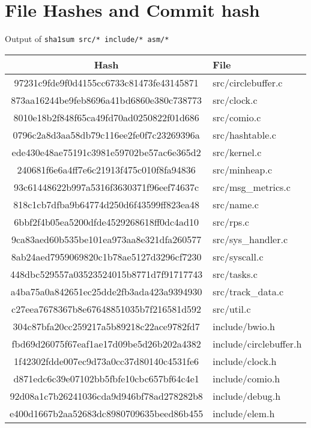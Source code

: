 \documentclass{article}
\begin{document}
\section{File Hashes and Commit hash}
\begin{minipage}{\textwidth}
Output of \verb|sha1sum src/* include/* asm/*|

\begin{tabular}{|c|l|}
\hline
Hash & File\\
\hline
97231c9fde9f0d4155cc6733c81473fe43145871    &     src/circlebuffer.c\\
873aa16244be9feb8696a41bd6860e380c738773    &     src/clock.c\\
8010e18b2f848f65ca49fd70ad0250822f01d686    &     src/comio.c\\
0796c2a8d3aa58db79c116ee2fe0f7c23269396a    &     src/hashtable.c\\
ede430e48ae75191c3981e59702be57ac6e365d2    &     src/kernel.c\\
240681f6e6a4ff7e6c21913f475c010f8fa94836    &     src/minheap.c\\
93c61448622b997a5316f3630371f96eef74637c    &     src/msg\_metrics.c\\
818c1cb7dfba9b64774d250d6f43599ff823ea48    &     src/name.c\\
6bbf2f4b05ea5200dfde4529268618ff0dc4ad10    &     src/rps.c\\
9ca83aed60b535be101ea973aa8e321dfa260577    &     src/sys\_handler.c\\
8ab24aed7959069820c1b78ae5127d3296cf7230    &     src/syscall.c\\
448dbc529557a03523524015b8771d7f91717743    &     src/tasks.c\\
a4ba75a0a842651ec25dde2fb3ada423a9394930    &     src/track\_data.c\\
c27eea7678367b8e67648851035b7f216581d592    &     src/util.c\\
304c87bfa20cc259217a5b89218c22ace9782fd7    &     include/bwio.h\\
fbd69d26075f67eaf1ae17d09be5d26b202a4382    &     include/circlebuffer.h\\
1f42302fdde007ec9d73a0cc37d80140c4531fe6    &     include/clock.h\\
d871edc6c39e07102bb5fbfe10cbc657bf64c4e1    &     include/comio.h\\
92d08a1c7b26241036cda9d946bf78ad278282b8    &     include/debug.h\\
e400d1667b2aa52683dc8980709635beed86b455    &     include/elem.h\\

\end{tabular}
\end{minipage}
\end{document}
